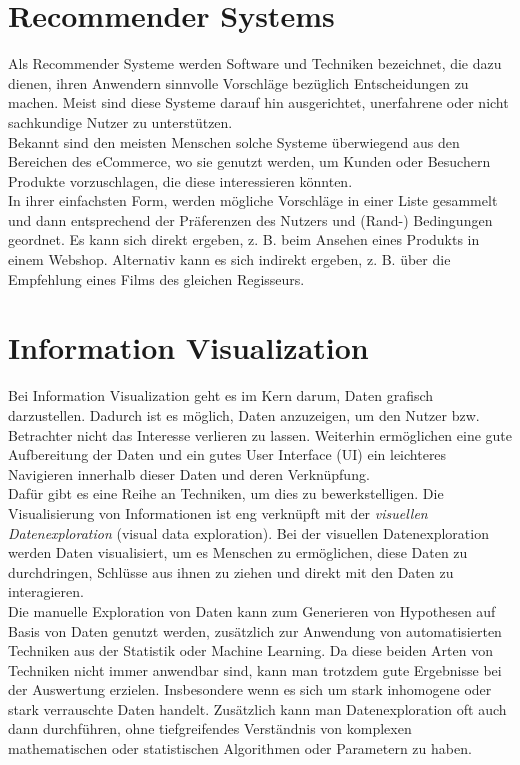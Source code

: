 	\section{Recommender Systems}
	Als Recommender Systeme werden Software und Techniken bezeichnet, die dazu
	dienen, ihren Anwendern sinnvolle Vorschläge bezüglich Entscheidungen zu
	machen. Meist sind diese Systeme darauf hin ausgerichtet, unerfahrene oder
	nicht sachkundige Nutzer zu unterstützen. \cite{Fra10}\\
	Bekannt sind den meisten Menschen solche Systeme überwiegend aus den Bereichen
	des eCommerce, wo sie genutzt werden, um Kunden oder Besuchern Produkte
	vorzuschlagen, die diese interessieren könnten.\\
	In ihrer einfachsten Form, werden mögliche Vorschläge in einer Liste gesammelt
	und dann entsprechend der Präferenzen des Nutzers und (Rand-) Bedingungen
	geordnet. Es kann sich direkt ergeben, z. B. beim Ansehen eines Produkts in
	einem Webshop. Alternativ kann es sich indirekt ergeben, z. B. über die
	Empfehlung eines Films des gleichen Regisseurs.\cite{Fra10}
	
	\section{Information Visualization}
	Bei Information Visualization geht es im Kern darum, Daten grafisch
	darzustellen. Dadurch ist es möglich, Daten anzuzeigen, um den
	Nutzer bzw. Betrachter nicht das Interesse verlieren zu lassen. Weiterhin
	ermöglichen eine gute Aufbereitung der Daten und ein gutes User Interface (UI)
	ein leichteres Navigieren innerhalb dieser Daten und deren Verknüpfung.\\
	Dafür gibt es eine Reihe an Techniken, um dies zu bewerkstelligen. Die
	Visualisierung von Informationen ist eng verknüpft mit der \textit{visuellen
	Datenexploration} (visual data exploration).
	Bei der visuellen Datenexploration werden Daten visualisiert, um es Menschen zu
	ermöglichen, diese Daten zu durchdringen, Schlüsse aus ihnen zu ziehen und
	direkt mit den Daten zu interagieren. \cite{Kei02}\\
	Die manuelle Exploration von Daten kann zum Generieren von Hypothesen auf Basis
	von Daten genutzt werden, zusätzlich zur Anwendung von automatisierten
	Techniken aus der Statistik oder Machine Learning. Da diese beiden Arten von
	Techniken nicht immer anwendbar sind, kann man trotzdem gute Ergebnisse bei der
	Auswertung erzielen. Insbesondere wenn es  sich um stark inhomogene oder stark
	verrauschte Daten handelt. Zusätzlich kann man Datenexploration oft auch dann
	durchführen, ohne tiefgreifendes Verständnis von komplexen  mathematischen oder
	statistischen Algorithmen oder Parametern zu haben.\cite{Kei02}
	
